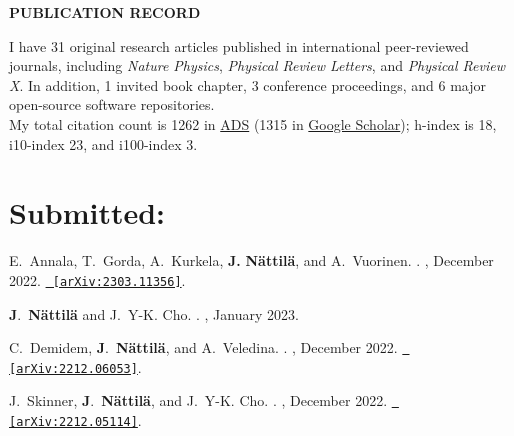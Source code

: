 \documentclass[letterpaper, onecolumn, 11pt]{article}
\begin{document}
\begin{center}
\textbf{PUBLICATION RECORD}
\end{center}

\noindent
I have 31 original research articles published in international peer-reviewed journals, including 
\textit{Nature Physics}, 
\textit{Physical Review Letters}, and 
\textit{Physical Review X}. 
In addition, 1 invited book chapter, 3 conference proceedings, and 6 major open-source software repositories.\\

\noindent
My total citation count is 1262 in \href{https://ui.adsabs.harvard.edu/search/q=%20author%3A%22nattila%22&sort=date%20desc%2C%20bibcode%20desc&p_=0}{ADS}
(1315 in \href{https://scholar.google.com/citations?user=d1fD9oYAAAAJ&hl=en}{Google Scholar}); 
h-index is 18, i10-index 23, and i100-index 3. 


\section*{Submitted:}
\vspace{-1cm}

\begin{thebibliography}{4}

E.~{Annala}, T.~{Gorda}, A.~{Kurkela}, \textbf{J.} \textbf{{N{\"a}ttil{\"a}}},
  and A.~{Vuorinen}.
.
\newblock {\em }, December 2022.
\href{http://arxiv.org/abs/2303.11356}{\nolinkurl{ [arXiv:2303.11356]}}.

\textbf{J}.~{\textbf{N\"attil\"a}} and J.~Y-K. {Cho}.
.
, January 2023.

C.~{Demidem}, \textbf{J}.~{\textbf{N\"attil\"a}}, and A.~{Veledina}.
.
, December 2022.
\href{http://arxiv.org/abs/2212.06053}{\nolinkurl{ [arXiv:2212.06053]}}.

J.~{Skinner}, \textbf{J}.~{\textbf{N\"attil\"a}}, and J.~Y-K. {Cho}.
.
, December 2022.
\href{http://arxiv.org/abs/2212.05114}{\nolinkurl{ [arXiv:2212.05114]}}.


\end{thebibliography}
\end{document}
